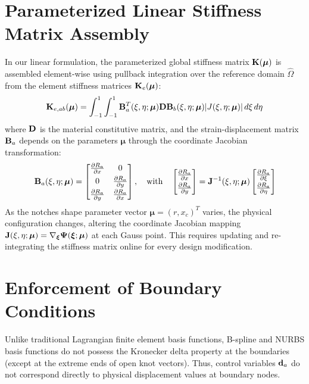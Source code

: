 \section{Parameterized Linear Stiffness Matrix Assembly}
In our linear formulation, the parameterized global stiffness matrix $\mathbf{K}(\boldsymbol{\mu})$ is assembled element-wise using pullback integration over the reference domain $\hat{\Omega}$ from the element stiffness matrices $\mathbf{K}_e(\boldsymbol{\mu})$:
\begin{equation}
    \mathbf{K}_{e, ab}(\boldsymbol{\mu}) = \int_{-1}^{1} \int_{-1}^{1} \mathbf{B}_a^T(\xi, \eta; \boldsymbol{\mu}) \mathbf{D} \mathbf{B}_b(\xi, \eta; \boldsymbol{\mu}) |J(\xi, \eta; \boldsymbol{\mu})| \, d\xi \, d\eta
\end{equation}
where $\mathbf{D}$ is the material constitutive matrix, and the strain-displacement matrix $\mathbf{B}_a$ depends on the parameters $\boldsymbol{\mu}$ through the coordinate Jacobian transformation:
\begin{equation}
    \mathbf{B}_a(\xi, \eta; \boldsymbol{\mu}) = \begin{bmatrix} \frac{\partial R_a}{\partial x} & 0 \\[0.3em] 0 & \frac{\partial R_a}{\partial y} \\[0.3em] \frac{\partial R_a}{\partial y} & \frac{\partial R_a}{\partial x} \end{bmatrix}, \quad \text{with} \quad \begin{bmatrix} \frac{\partial R_a}{\partial x} \\[0.3em] \frac{\partial R_a}{\partial y} \end{bmatrix} = \mathbf{J}^{-1}(\xi, \eta; \boldsymbol{\mu}) \begin{bmatrix} \frac{\partial R_a}{\partial \xi} \\[0.3em] \frac{\partial R_a}{\partial \eta} \end{bmatrix}
\end{equation}
As the notches shape parameter vector $\boldsymbol{\mu} = (r, x_c)^T$ varies, the physical configuration changes, altering the coordinate Jacobian mapping $\mathbf{J}(\xi, \eta; \boldsymbol{\mu}) = \nabla_{\boldsymbol{\xi}}\boldsymbol{\Psi}(\boldsymbol{\xi}; \boldsymbol{\mu})$ at each Gauss point. This requires updating and re-integrating the stiffness matrix online for every design modification.

\section{Enforcement of Boundary Conditions}
Unlike traditional Lagrangian finite element basis functions, B-spline and NURBS basis functions do not possess the Kronecker delta property at the boundaries (except at the extreme ends of open knot vectors). Thus, control variables $\mathbf{d}_a$ do not correspond directly to physical displacement values at boundary nodes.

